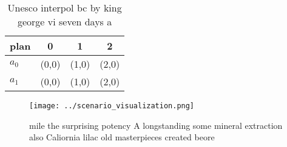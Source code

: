 \documentclass[a4paper]{article}
\begin{document}
\begin{table}
\begin{adjustbox}{width=0.6\columnwidth}
\begin{tabular}{|l|l|l|l|}
\hline
\textbf{plan} & \multicolumn{1}{c|}{\textbf{0}} & \multicolumn{1}{c|}{\textbf{1}} & \multicolumn{1}{c|}{\textbf{2}} \\ \hline
\textbf{$a_0$}  & (0,0) & (1,0) & (2,0) \\ \hline
\textbf{$a_1$}  & (0,0) & (1,0) & (2,0) \\ \hline
\end{tabular}
\end{adjustbox}
\caption{Unesco interpol bc by king george vi seven days a
}
\end{table}

\begin{figure}
\centering
\texttt{[image: ../scenario\_visualization.png]}
\caption{mile the surprising potency A longstanding some mineral extraction also Caliornia lilac old masterpieces created beore 
}
\end{figure}
 
\end{document}
